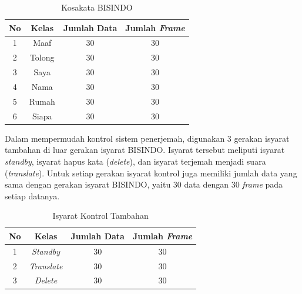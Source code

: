 \begin{longtable}{|c|c|c|c|}
  \caption{Kosakata BISINDO}
  \label{tb:kosakataBISINDO}                                   \\
  \hline
  \rowcolor[HTML]{C0C0C0}
  \textbf{No} & \textbf{Kelas} & \textbf{Jumlah Data} & \textbf{Jumlah \emph{Frame}}\\
  \hline
  1            & Maaf                       & 30            & 30\\
  2            & Tolong                     & 30            & 30\\
  3            & Saya                       & 30            & 30\\
  4            & Nama                       & 30            & 30\\
  5            & Rumah                       & 30            & 30\\
  6            & Siapa                       & 30            & 30\\
  \hline
\end{longtable}


Dalam mempermudah kontrol sistem penerjemah, digunakan 3 gerakan isyarat tambahan di luar gerakan isyarat BISINDO.  Isyarat tersebut meliputi isyarat \textit{standby}, isyarat hapus kata (\textit{delete}), dan isyarat terjemah menjadi suara (\textit{translate}).  Untuk setiap gerakan isyarat kontrol juga memiliki jumlah data yang sama dengan gerakan isyarat BISINDO, yaitu 30 data dengan 30 \emph{frame} pada setiap datanya.

\begin{longtable}{|c|c|c|c|}
  \caption{Isyarat Kontrol Tambahan}
  \label{tb:isyaratkontrol}                                   \\
  \hline
  \rowcolor[HTML]{C0C0C0}
  \textbf{No} & \textbf{Kelas} & \textbf{Jumlah Data} & \textbf{Jumlah \emph{Frame}}\\
  \hline
  1            & \textit{Standby}                       & 30             & 30 \\
  2            & \textit{Translate}                     & 30             & 30 \\
  3            & \textit{Delete}                        & 30             & 30 \\
  \hline
\end{longtable}
\newpage
